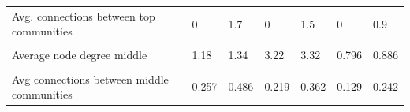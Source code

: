\documentclass[
]{article}
\begin{document}
\begin{table}
\begin{tabular}[t]{>{\raggedright\arraybackslash}p{8em}llllll}
Avg. connections between top communities & 0 & 1.7 & 0 & 1.5 & 0 & 0.9\\
\cellcolor{gray!10}{Modularity (middle)} & \cellcolor{gray!10}{0.781} & \cellcolor{gray!10}{0.679} & \cellcolor{gray!10}{0.873} & \cellcolor{gray!10}{0.845} & \cellcolor{gray!10}{0.787} & \cellcolor{gray!10}{0.696}\\
Average node degree middle & 1.18 & 1.34 & 3.22 & 3.32 & 0.796 & 0.886\\
\cellcolor{gray!10}{Avg connections within middle communities} & \cellcolor{gray!10}{20} & \cellcolor{gray!10}{20} & \cellcolor{gray!10}{61.333} & \cellcolor{gray!10}{61.333} & \cellcolor{gray!10}{9.667} & \cellcolor{gray!10}{9.667}\\
\addlinespace
Avg connections between middle communities & 0.257 & 0.486 & 0.219 & 0.362 & 0.129 & 0.242\\
\bottomrule
\end{tabular}
\end{table}
\end{document}
